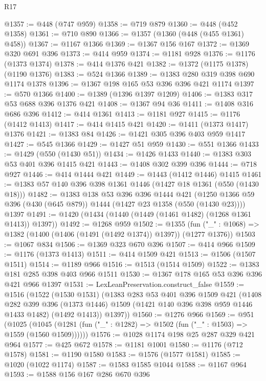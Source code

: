 \begin{lexlean}{R17}
\begin{coremodule}
@1357 := @448 (@747 @959)
@1358 := @719 @879
@1360 := @448 (@452 @1358)
@1361 := @710 @890
@1366 := @1357 (@1360 (@448 (@455 @1361) @458))
@1367 := @1167 @1366
@1369 := @1367 @156 @167
@1372 := @1369 @320 @691 @396
@1373 := @414 @959
@1374 := @1181 @928
@1376 := @1176 (@1373 @1374)
@1378 := @414 @1376 @421
@1382 := @1372 (@1175 @1378) (@1190 @1376)
@1383 := @524 @1366
@1389 := @1383 @280 @319 @398 @690 @1174 @1378
@1396 := @1367 @198 @165 @53 @396 @396 @421 @1174
@1397 := @570 @1366
@1400 := @1389 (@1396 @1397 @1209)
@1406 := @1383 @317 @53 @688 @396 @1376 @421
@1408 := @1367 @94 @36
@1411 := @1408 @316 @686 @396
@1412 := @414 @1361
@1413 := @1181 @927
@1415 := @1176 (@1412 @1413)
@1417 := @414 @1415 @421
@1420 := @1411 (@1373 @1417) @1376
@1421 := @1383 @84
@1426 := @1421 @305 @396 @403 @959 @1417
@1427 := @545 @1366
@1429 := @1427 @51 @959
@1430 := @551 @1366
@1433 := @1429 (@550 (@1430 @51))
@1434 := @1426 @1433
@1440 := @1383 @303 @53 @401 @396 @1415 @421
@1443 := @1408 @302 @399 @396
@1444 := @718 @927
@1446 := @414 @1444 @421
@1449 := @1443 (@1412 @1446) @1415
@1461 := @1383 @57 @140 @396 @398 @1361 @1446 (@1427 @18 @1361 (@550 (@1430 @18)))
@1482 := @1383
    @138
    @53
    @396
    @396
    @1444
    @421
    (@1250 @1366 @59 @396 (@430 (@645 @879)) @1444 (@1427 @23 @1358 (@550 (@1430 @23))))
    @1397
@1491 := @1420 (@1434 (@1440 (@1449 (@1461 @1482) (@1268 @1361 @1413)) @1397))
@1492 := @1268 @959
@1502 := @1355
    (fun ("_" : @1068) => @1382 (@1400 (@1406 (@1491 (@1492 @1374)) @1397)) (@1277 @1376))
@1503 := @1067 @834
@1506 := @1369 @323 @670 @396
@1507 := @414 @966
@1509 := @1176 (@1373 @1413)
@1511 := @414 @1509 @421
@1513 := @1506 (@1507 @1511)
@1514 := @1189 @966
@1516 := @1513 (@1514 @1509)
@1522 := @1383 @181 @285 @398 @403 @966 @1511
@1530 := @1367 @178 @165 @53 @396 @396 @421 @966 @1397
@1531 := LexLeanPreservation.construct_false
@1559 := @1516
    (@1522
      (@1530 @1531)
      (@1383
        @283
        @53
        @401
        @396
        @1509
        @421
        (@1408
          @282
          @399
          @396
          (@1373 @1446)
          @1509
          (@1421 @140 @396 @398 @959 @1446 @1433 @1482)
          (@1492 @1413))
        @1397))
@1560 := @1276 @966
@1569 := @951
    (@1025 (@1045 (@1281 (fun ("_" : @1282) => @1502 (fun ("_" : @1503) => @1559 (@1560 @1509))))))
@1576 := @1028 @1174 @198 @25 @287 @329 @421 @964
@1577 := @425 @672
@1578 := @1181 @1001
@1580 := @1176 (@712 @1578)
@1581 := @1190 @1580
@1583 := @1576 (@1577 @1581)
@1585 := @1020 (@1022 @1174)
@1587 := @1583 @1585 @1044
@1588 := @1167 @964
@1593 := @1588 @156 @167 @286 @670 @396

\end{coremodule}
\end{lexlean}
